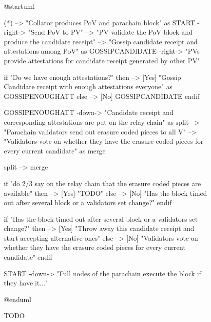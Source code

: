 \documentclass{book}
\begin{document}
\begin{figure}[h!]
\begin{plantuml}
@startuml

(*) --> "Collator produces PoV and parachain block" as START
-right-> "Send PoV to PV"
--> "PV validate the PoV block and produce the candidate receipt"
--> "Gossip candidate receipt and attestations among PoV" as GOSSIPCANDIDATE
-right-> "PVs provide attestations for candidate receipt generated by other PV"

if "Do we have enough attestations?" then
    --> [Yes] "Gossip Candidate receipt with enough attestations everyone" as GOSSIPENOUGHATT
else
    --> [No] GOSSIPCANDIDATE
endif

GOSSIPENOUGHATT -down-> "Candidate receipt and corresponding attestations are put on the relay chain" as split
--> "Parachain validators send out erasure coded pieces to all V"
--> "Validators vote on whether they have the erasure coded pieces for every current candidate" as merge

split --> merge

if "do 2/3 say on the relay chain that the erasure coded pieces are available" then
    --> [Yes] "TODO"
else
    --> [No] "Has the block timed out after several block or a validators set change?"
endif

if "Has the block timed out after several block or a validators set change?" then
    --> [Yes] "Throw away this candidate receipt and start accepting alternative ones"
else
    --> [No] "Validators vote on whether they have the erasure coded pieces for every current candidate"
endif

START -down-> "Full nodes of the parachain execute the block if they have it..."

@enduml
\end{plantuml}
\caption{TODO}
\end{figure}
\end{document}
